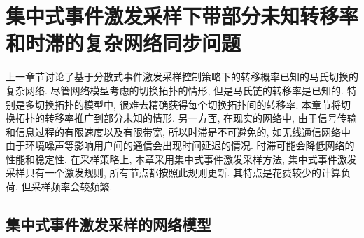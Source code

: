 

\chapter{集中式事件激发采样下带部分未知转移率和时滞的复杂网络同步问题}
    上一章节讨论了基于分散式事件激发采样控制策略下的转移概率已知的马氏切换的复杂网络. 尽管网络模型考虑的切换拓扑的情形, 但是马氏链的转移率是已知的. 特别是多切换拓扑的模型中, 很难去精确获得每个切换拓扑间的转移率. 本章节将切换拓扑的转移率推广到部分未知的情形. 另一方面, 在现实的网络中, 由于信号传输和信息过程的有限速度以及有限带宽, 所以时滞是不可避免的, 如无线通信网络中由于环境噪声等影响用户间的通信会出现时间延迟的情况. 时滞可能会降低网络的性能和稳定性. 在采样策略上, 本章采用集中式事件激发采样方法, 集中式事件激发采样只有一个激发规则, 所有节点都按照此规则更新. 其特点是花费较少的计算负荷. 但采样频率会较频繁.


\section{集中式事件激发采样的网络模型}

